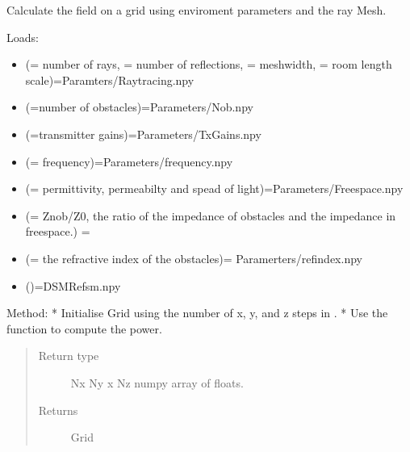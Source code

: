\documentclass[letterpaper,10pt,english]{sphinxmanual}
\begin{document}
\begin{fulllineitems}
\label{\detokenize{index:RayTracerMainProgram.power_grid}}
Calculate the field on a grid using enviroment parameters and the   ray Mesh.

Loads:
\begin{itemize}
\item {} 
(= number of rays, = number of reflections,   = meshwidth, = room length scale)=\textasciigrave{}Paramters/Raytracing.npy\textasciigrave{}

\item {} 
(=number of obstacles)=\textasciigrave{}Parameters/Nob.npy\textasciigrave{}

\item {} 
(=transmitter gains)=\textasciigrave{}Parameters/TxGains.npy\textasciigrave{}

\item {} 
(= frequency)=\textasciigrave{}Parameters/frequency.npy\textasciigrave{}

\item {} 
(= permittivity, permeabilty   and spead of light)=\textasciigrave{}Parameters/Freespace.npy\textasciigrave{}

\item {} 
(= Znob/Z0, the ratio of the impedance of obstacles and   the impedance in freespace.) = 

\item {} 
(= the refractive index of the obstacles)=  Paramerters/refindex.npy\textasciigrave{}

\item {} 
()=\textasciigrave{}DSMRefsm.npy\textasciigrave{}

\end{itemize}

Method:
* Initialise Grid using the number of x, y, and z steps in .
* Use the function 
to compute the power.
\begin{quote}\begin{description}
\item[{Return type}] \leavevmode
Nx Ny x Nz numpy array of floats.

\item[{Returns}] \leavevmode
Grid

\end{description}\end{quote}

\end{fulllineitems}
\end{document}
